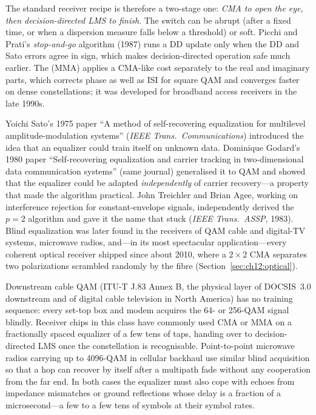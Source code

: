 The standard receiver recipe is therefore a two-stage one: \emph{CMA to open the eye, then
decision-directed LMS to finish}. The switch can be abrupt (after a fixed time, or when a
dispersion measure falls below a threshold) or soft. Picchi and Prati's \emph{stop-and-go}
algorithm (1987) runs a DD update only when the DD and Sato errors agree in sign, which makes
decision-directed operation safe much earlier. The  (MMA) applies a
CMA-like cost separately to the real and imaginary parts, which corrects phase as well as ISI for
square QAM and converges faster on dense constellations; it was developed for broadband access
receivers in the late 1990s.

\begin{history}
Yoichi Sato's 1975 paper ``A method of self-recovering equalization for multilevel
amplitude-modulation systems'' (\emph{IEEE Trans.\ Communications}) introduced the idea that an
equalizer could train itself on unknown data. Dominique Godard's 1980 paper ``Self-recovering
equalization and carrier tracking in two-dimensional data communication systems'' (same journal)
generalised it to QAM and showed that the equalizer could be adapted \emph{independently} of carrier
recovery---a property that made the algorithm practical. John Treichler and Brian Agee, working on
interference rejection for constant-envelope signals, independently derived the $p=2$ algorithm and
gave it the name that stuck (\emph{IEEE Trans.\ ASSP}, 1983). Blind equalization was later found in
the receivers of QAM cable and digital-TV systems, microwave radios, and---in its most spectacular
application---every coherent optical receiver shipped since about 2010, where a $2\times2$ CMA
separates two polarizations scrambled randomly by the fibre (Section~\ref{sec:ch12:optical}).
\end{history}

\begin{inpractice}
Downstream cable QAM (ITU-T J.83 Annex B, the physical layer of DOCSIS~3.0 downstream and of digital
cable television in North America) has no training sequence: every set-top box and modem acquires the
64- or 256-QAM signal blindly. Receiver chips in this class have commonly used CMA or MMA on a
fractionally spaced equalizer of a few tens of taps, handing over to decision-directed LMS once the
constellation is recognisable. Point-to-point microwave radios carrying up to 4096-QAM in cellular
backhaul use similar blind acquisition so that a hop can recover by itself after a multipath fade
without any cooperation from the far end. In both cases the equalizer must also cope with echoes from
impedance mismatches or ground reflections whose delay is a fraction of a microsecond---a few to a few
tens of symbols at their symbol rates.
\end{inpractice}

